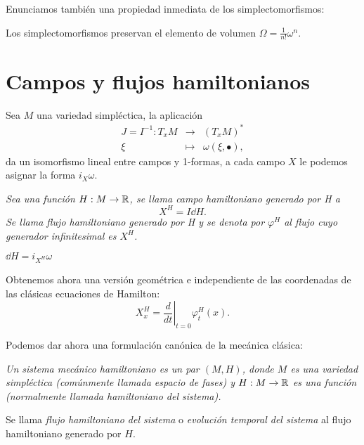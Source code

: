 Enunciamos también una propiedad inmediata de los simplectomorfismos:
\begin{prop}\label{volumen}
  Los simplectomorfismos preservan el elemento de volumen $\Omega=\frac{1}{n!}\omega^n$.
\end{prop}

\section{Campos y flujos hamiltonianos}\label{4}
\begin{obs}
  Sea $M$ una variedad simpléctica, la aplicación 
  \begin{equation*}
    \begin{array}{rcl}
      J=I^{-1}: T_xM & \longrightarrow & (T_xM)^* \\
      \xi & \longmapsto & \omega(\xi,\bullet),
      \end{array} 
  \end{equation*}
da un isomorfismo lineal entre campos y 1-formas, a cada campo $X$ le podemos asignar la forma $i_X \omega$.
\end{obs}
\begin{defn}
  \em
  Sea una función $H:M \rightarrow \mathbb{R}$, se llama \emph{campo hamiltoniano generado por H} a 
  \begin{equation*}
    X^H=I \dd H.
  \end{equation*}
  Se llama \emph{flujo hamiltoniano generado por H} y se denota por $\varphi^H$ al flujo cuyo generador infinitesimal es $X^H$.
\end{defn}
\begin{obs}
  $\dd H = i_{X^H}\omega$
\end{obs}
\begin{obs}
  Obtenemos ahora una versión geométrica e independiente de las coordenadas de las clásicas ecuaciones de Hamilton:
  \begin{equation*}
    X^H_x= \left.\frac{d}{dt}\right| _{t=0}\varphi^H_t(x).
  \end{equation*}
\end{obs}
Podemos dar ahora una formulación canónica de la mecánica clásica:
\begin{defn}
  \em
  Un \emph{sistema mecánico hamiltoniano} es un par $(M,H)$, donde $M$ es una variedad simpléctica (comúnmente llamada \emph{espacio de fases}) y $H:M \rightarrow \mathbb{R}$ es una función (normalmente llamada \emph{hamiltoniano} del sistema).

  Se llama \emph{flujo hamiltoniano del sistema} o \emph{evolución temporal del sistema} al flujo hamiltoniano generado por $H$.
\end{defn}

